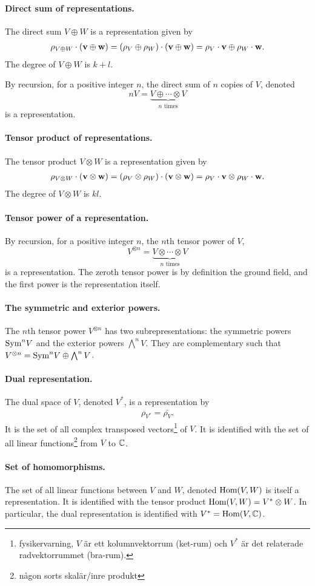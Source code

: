 	\paragraph{Direct sum of representations.} The direct sum $V \oplus W$ is a representation given by
	\begin{align}
		\rho_{V \oplus W}\cdot(\mathbf{v} \oplus \mathbf{w}) = (\rho_V \oplus \rho_W)\cdot(\mathbf{v} \oplus \mathbf{w}) = \rho_V \cdot \mathbf{v} \oplus \rho_W \cdot \mathbf{w}.
	\end{align}
	The degree of $V \oplus W$ is $k+l$.
	
	By recursion, for a positive integer $n$, the direct sum of $n$ copies of $V$, denoted
	\[
		nV = \underset{n \text{ times}}{\underbrace{V \oplus \cdots \otimes V}}
	\]
	is a representation.
	
	\paragraph{Tensor product of representations.} The tensor product $V \otimes W$ is a representation given by
	\begin{align}
		\rho_{V \otimes W}\cdot(\mathbf{v} \otimes \mathbf{w}) = (\rho_V \otimes \rho_W)\cdot(\mathbf{v} \otimes \mathbf{w}) = \rho_V \cdot \mathbf{v} \otimes \rho_W \cdot \mathbf{w}.
	\end{align}
	The degree of $V \otimes W$ is $kl$.
	
	\paragraph{Tensor power of a representation.} By recursion, for a positive integer $n$, the $n$th tensor power of $V$,
	\[
		V^{\otimes n} = \underset{n \text{ times}}{\underbrace{V \otimes \cdots \otimes V}}
	\]
	is a representation. The zeroth tensor power is by definition the ground field, and the first power is the representation itself. 
	
	\paragraph{The symmetric and exterior powers.} The $n$th tensor power $V^{\otimes n}$ has two  subrepresentations: the symmetric powers $\text{Sym}^n V$ and the exterior powers $ \bigwedge^n V$. They are complementary such that $V^{\otimes n} = \text{Sym}^n V \oplus \bigwedge^n V$.
	
	\paragraph{Dual representation.} The dual space of $V$, denoted $V^*$, is a representation by 
	\begin{align}
		\rho_{V^*} = \bar{\rho_V}.
	\end{align}
	It is the set of all complex transposed vectors\footnote{fysikervarning, $V$ är ett kolumnvektorrum (ket-rum) och $V^*$ är det relaterade radvektorrummet (bra-rum).} of $V$. It is identified with the set of all linear functions\footnote{någon sorts skalär/inre produkt} from $V$ to $\mathbb{C}$.
	
	\paragraph{Set of homomorphisms.} The set of all linear functions between $V$ and $W$, denoted $\text{Hom}(V,W)$ is itself a representation. It is identified with the tensor product $\text{Hom}(V,W) = V^* \otimes W$. In particular, the dual representation is identified with $V^* = \text{Hom}(V,\mathbb{C})$.


	